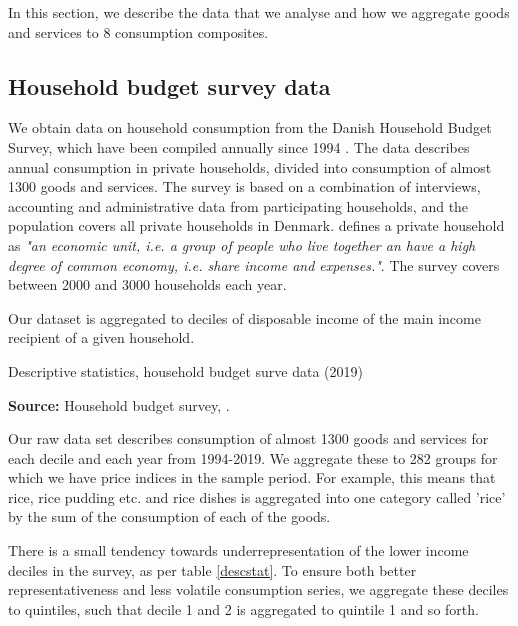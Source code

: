 In this section, we describe the data that we analyse and how we aggregate goods and services to 8 consumption composites.

\subsection{Household budget survey data}
We obtain data on household consumption from the Danish Household Budget Survey, which have been compiled annually since 1994 \citep{hhbudgetsurvey}. The data describes annual consumption in private households, divided into consumption of almost 1300 goods and services. The survey is based on a combination of interviews, accounting and administrative data from participating households, and the population covers all private households in Denmark. \cite{hhbudgetsurvey} defines a private household as \textit{"an economic unit, i.e. a group of people who live together an have a high degree of common economy, i.e. share income and expenses."}. The survey covers between 2000 and 3000 households each year.

Our dataset is aggregated to deciles of disposable income of the main income recipient of a given household. 

\begin{table}[]
\caption{Descriptive statistics, household budget surve data (2019)}
\label{descstat}
\resizebox{\textwidth}{!}{
}
    \captionsetup{singlelinecheck=off,size=scriptsize}
\setlength{\captionmargin}{10pt}
\caption*{
\textbf{Source:} Household budget survey, \cite{hhbudgetsurvey}.}
\end{table}

Our raw data set describes consumption of almost 1300 goods and services for each decile and each year from 1994-2019. We aggregate these to 282 groups for which we have price indices in the sample period. For example, this means that rice, rice pudding etc. and rice dishes is aggregated into one category called 'rice' by the sum of the consumption of each of the goods. 

There is a small tendency towards underrepresentation of the lower income deciles in the survey, as per table \ref{descstat}. To ensure both better representativeness and less volatile consumption series, we aggregate these deciles to quintiles, such that decile 1 and 2 is aggregated to quintile 1 and so forth.

